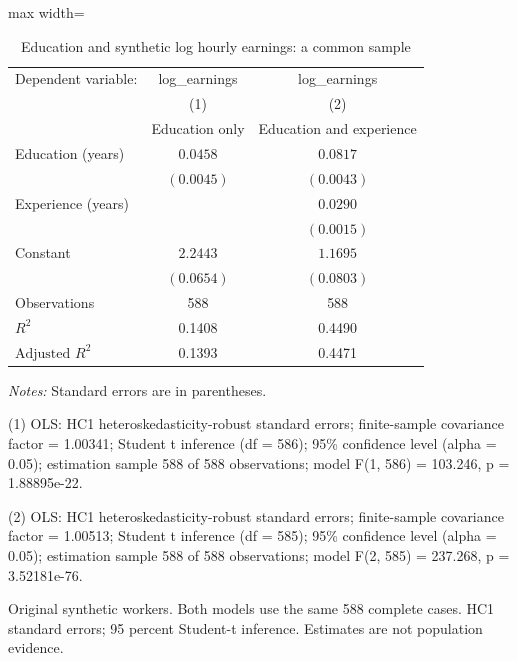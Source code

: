 \begin{table}[htbp]
\centering
\caption{Education and synthetic log hourly earnings: a common sample}
\label{tab:lab06}
\begingroup
\small
\setlength{\tabcolsep}{6pt}
\renewcommand{\arraystretch}{1.12}
\begin{adjustbox}{max width=\linewidth}
\begin{tabular}{@{}lcc@{}}
\toprule
Dependent variable: & log\_earnings & log\_earnings \\
 & (1) & (2) \\
 & Education only & Education and experience \\
\midrule
Education (years) & $0.0458$ & $0.0817$ \\
 & $(0.0045)$ & $(0.0043)$ \\[0.35em]
Experience (years) &  & $0.0290$ \\
 &  & $(0.0015)$ \\[0.35em]
Constant & $2.2443$ & $1.1695$ \\
 & $(0.0654)$ & $(0.0803)$ \\[0.35em]
\midrule
Observations & 588 & 588 \\
$R^{2}$ & 0.1408 & 0.4490 \\
$\text{Adjusted }R^{2}$ & 0.1393 & 0.4471 \\
\bottomrule
\end{tabular}
\end{adjustbox}
\par\smallskip
\begin{minipage}{\linewidth}
\footnotesize
\raggedright
\textit{Notes:} Standard errors are in parentheses.\par
(1) OLS: HC1 heteroskedasticity-robust standard errors; finite-sample covariance factor = 1.00341; Student t inference (df = 586); 95\% confidence level (alpha = 0.05); estimation sample 588 of 588 observations; model F(1, 586) = 103.246, p = 1.88895e-22.\par
(2) OLS: HC1 heteroskedasticity-robust standard errors; finite-sample covariance factor = 1.00513; Student t inference (df = 585); 95\% confidence level (alpha = 0.05); estimation sample 588 of 588 observations; model F(2, 585) = 237.268, p = 3.52181e-76.\par
Original synthetic workers. Both models use the same 588 complete cases. HC1 standard errors; 95 percent Student-t inference. Estimates are not population evidence.\par
\end{minipage}
\endgroup
\end{table}